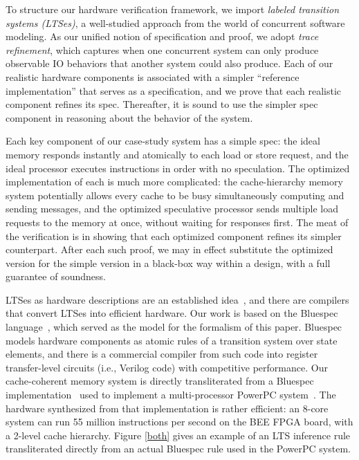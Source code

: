To structure our hardware verification framework, we import
\emph{labeled transition systems (LTSes)}, a well-studied approach from the
world of concurrent software modeling.  As our unified notion of
specification and proof, we adopt \emph{trace refinement}, which
captures when one concurrent system can only produce observable IO
behaviors that another system could also produce.  Each of our
realistic hardware components is associated with a simpler ``reference
implementation'' that serves as a specification, and we prove that
each realistic component refines its spec.  Thereafter, it is sound to
use the simpler spec component in reasoning about the behavior of the
system.

Each key component of our case-study system has a simple spec: the
ideal memory responds instantly and atomically to each load or store
request, and the ideal processor executes instructions in order with
no speculation.  The optimized implementation of each is much more
complicated: the cache-hierarchy memory system potentially allows
every cache to be busy simultaneously computing and sending messages,
and the optimized speculative processor sends multiple load requests
to the memory at once, without waiting for responses first.  The meat
of the verification is in showing that each optimized component
refines its simpler counterpart.  After each such proof, we may in
effect substitute the optimized version for the simple version in a
black-box way within a design, with a full guarantee of soundness.

LTSes as hardware descriptions are an established
idea~\cite{HoeArvind:TRSSynthesis1, Hoe:TCAD}, and there are
compilers that convert LTSes into efficient hardware.  Our work is
based on the Bluespec language~\cite{BSV:LangRef, Bluespec:TFRG},
which served as the model for the formalism of this paper.  Bluespec
models hardware components as atomic rules of a transition system over
state elements, and there is a commercial compiler from such code into
register transfer-level circuits (i.e., Verilog code) with competitive
performance.  Our cache-coherent memory system is directly
transliterated from a Bluespec
implementation~\cite{DNA:CoherenceImplementation} used to
implement a multi-processor PowerPC system~\cite{Khan:PowerPc}. The
hardware synthesized from that implementation is rather efficient:
an 8-core system can run 55 million instructions per second on
the BEE FPGA board\cite{}, with a 2-level cache hierarchy. Figure \ref{both} gives an example
of an LTS inference rule transliterated directly from an actual Bluespec rule used
in the PowerPC system.

